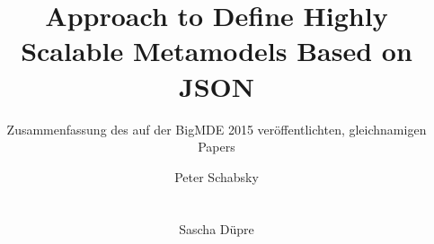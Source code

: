 \documentclass[ngerman]{ewks-latex}
\begin{document}
\title{Approach to Define Highly Scalable Metamodels Based on JSON}

\subtitle{Zusammenfassung des auf der BigMDE 2015 veröffentlichten, gleichnamigen Papers}

\author{
	\alignauthor
	Peter Schabsky\\
	\\
    \\
	\alignauthor
	Sascha D\"upre\\
	\\
    \\
}

\maketitle












\end{document}
